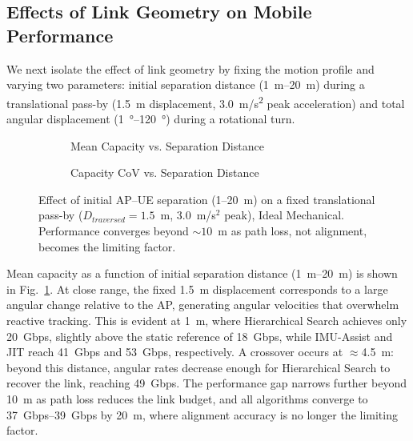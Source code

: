 \documentclass[fleqn,10pt]{wlscirep}
\begin{document}
\subsection*{Effects of Link Geometry on Mobile Performance}

We next isolate the effect of link geometry by fixing the motion profile and varying two parameters: initial separation distance (\SIrange{1}{20}{m}) during a translational pass-by (\SI{1.5}{m} displacement, \SI{3.0}{m/s^2} peak acceleration) and total angular displacement (\SIrange{1}{120}{\degree}) during a rotational turn.

\begin{figure}[h!]
    \centering
    \begin{subfigure}{0.495\linewidth}
        
        \vspace{-25pt}
        \caption{Mean Capacity vs. Separation Distance}
        \label{fig:dist_rate}
    \end{subfigure}
    \hfill
    \begin{subfigure}{0.495\linewidth}
        
        \vspace{-25pt}
        \caption{Capacity CoV vs. Separation Distance}
        \label{fig:dist_cov}
    \end{subfigure}
    \caption{Effect of initial AP--UE separation (1--20~m) on a fixed translational pass-by ($D_{traversed} = 1.5$~m, $3.0$~m/s$^2$ peak), Ideal Mechanical. Performance converges beyond ${\sim}10$~m as path loss, not alignment, becomes the limiting factor.}
    \vspace{-5pt}
\end{figure}

Mean capacity as a function of initial separation distance (\SIrange{1}{20}{m}) is shown in Fig.~\ref{fig:dist_rate}. At close range, the fixed \SI{1.5}{m} displacement corresponds to a large angular change relative to the AP, generating angular velocities that overwhelm reactive tracking. This is evident at \SI{1}{m}, where Hierarchical Search achieves only \SI{20}{Gbps}, slightly above the static reference of \SI{18}{Gbps}, while IMU-Assist and JIT reach \SI{41}{Gbps} and \SI{53}{Gbps}, respectively. A crossover occurs at $\approx$\SI{4.5}{m}: beyond this distance, angular rates decrease enough for Hierarchical Search to recover the link, reaching \SI{49}{Gbps}. The performance gap narrows further beyond \SI{10}{m} as path loss reduces the link budget, and all algorithms converge to \SIrange{37}{39}{Gbps} by \SI{20}{m}, where alignment accuracy is no longer the limiting factor.
\end{document}
